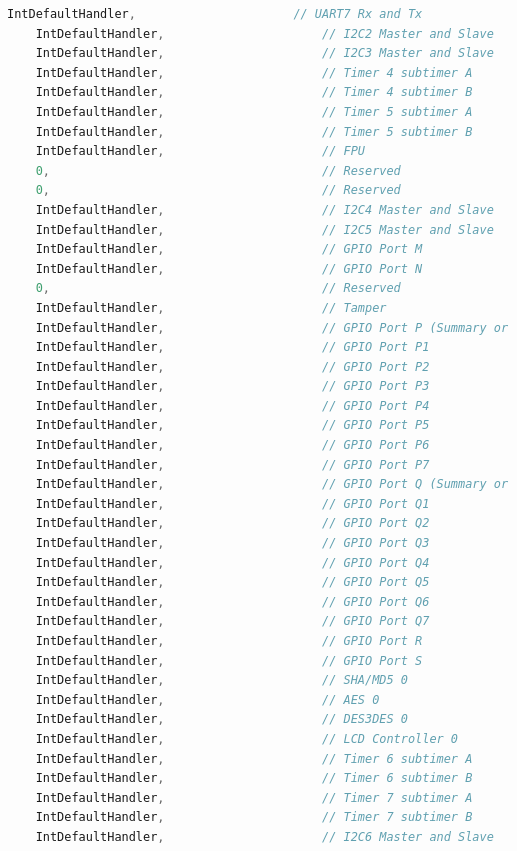 \documentclass{article}
\begin{document}
\begin{lstlisting}[language=c, caption={startup$\textunderscore$ccs.c}, captionpos=b]
    IntDefaultHandler,                      // UART7 Rx and Tx
    IntDefaultHandler,                      // I2C2 Master and Slave
    IntDefaultHandler,                      // I2C3 Master and Slave
    IntDefaultHandler,                      // Timer 4 subtimer A
    IntDefaultHandler,                      // Timer 4 subtimer B
    IntDefaultHandler,                      // Timer 5 subtimer A
    IntDefaultHandler,                      // Timer 5 subtimer B
    IntDefaultHandler,                      // FPU
    0,                                      // Reserved
    0,                                      // Reserved
    IntDefaultHandler,                      // I2C4 Master and Slave
    IntDefaultHandler,                      // I2C5 Master and Slave
    IntDefaultHandler,                      // GPIO Port M
    IntDefaultHandler,                      // GPIO Port N
    0,                                      // Reserved
    IntDefaultHandler,                      // Tamper
    IntDefaultHandler,                      // GPIO Port P (Summary or P0)
    IntDefaultHandler,                      // GPIO Port P1
    IntDefaultHandler,                      // GPIO Port P2
    IntDefaultHandler,                      // GPIO Port P3
    IntDefaultHandler,                      // GPIO Port P4
    IntDefaultHandler,                      // GPIO Port P5
    IntDefaultHandler,                      // GPIO Port P6
    IntDefaultHandler,                      // GPIO Port P7
    IntDefaultHandler,                      // GPIO Port Q (Summary or Q0)
    IntDefaultHandler,                      // GPIO Port Q1
    IntDefaultHandler,                      // GPIO Port Q2
    IntDefaultHandler,                      // GPIO Port Q3
    IntDefaultHandler,                      // GPIO Port Q4
    IntDefaultHandler,                      // GPIO Port Q5
    IntDefaultHandler,                      // GPIO Port Q6
    IntDefaultHandler,                      // GPIO Port Q7
    IntDefaultHandler,                      // GPIO Port R
    IntDefaultHandler,                      // GPIO Port S
    IntDefaultHandler,                      // SHA/MD5 0
    IntDefaultHandler,                      // AES 0
    IntDefaultHandler,                      // DES3DES 0
    IntDefaultHandler,                      // LCD Controller 0
    IntDefaultHandler,                      // Timer 6 subtimer A
    IntDefaultHandler,                      // Timer 6 subtimer B
    IntDefaultHandler,                      // Timer 7 subtimer A
    IntDefaultHandler,                      // Timer 7 subtimer B
    IntDefaultHandler,                      // I2C6 Master and Slave

\end{lstlisting}
\end{document}
